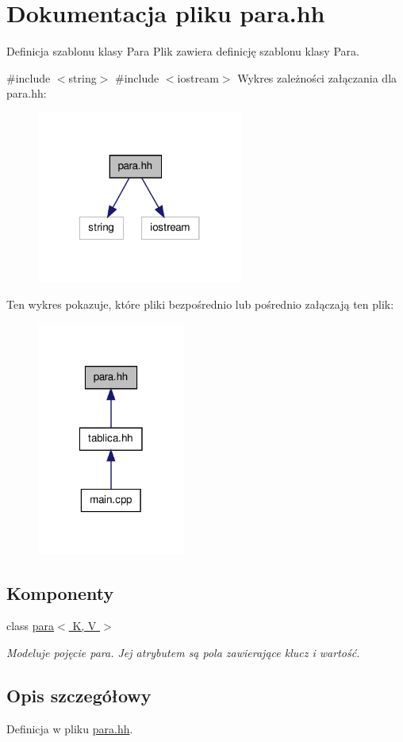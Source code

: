 \hypertarget{para_8hh}{\section{\-Dokumentacja pliku para.\-hh}
\label{para_8hh}
}


\-Definicja szablonu klasy \-Para \-Plik zawiera definicję szablonu klasy \-Para.  


{\ttfamily \#include $<$string$>$}\*
{\ttfamily \#include $<$iostream$>$}\*
\-Wykres zależności załączania dla para.\-hh\-:\nopagebreak
\begin{figure}[H]
\begin{center}
\leavevmode
\includegraphics[width=192pt]{para_8hh__incl}
\end{center}
\end{figure}
\-Ten wykres pokazuje, które pliki bezpośrednio lub pośrednio załączają ten plik\-:\nopagebreak
\begin{figure}[H]
\begin{center}
\leavevmode
\includegraphics[width=138pt]{para_8hh__dep__incl}
\end{center}
\end{figure}
\subsection*{\-Komponenty}
\begin{DoxyCompactItemize}
\item 
class \hyperlink{classpara}{para$<$ K, V $>$}
\begin{DoxyCompactList}\small\item\em \-Modeluje pojęcie para. \-Jej atrybutem są pola zawierające klucz i wartość. \end{DoxyCompactList}\end{DoxyCompactItemize}


\subsection{\-Opis szczegółowy}


\-Definicja w pliku \hyperlink{para_8hh_source}{para.\-hh}.

